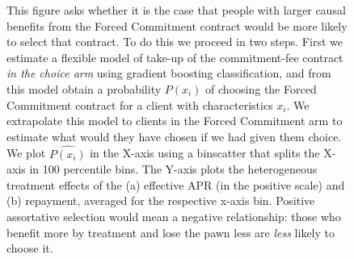 \documentclass[oneside,11pt]{article}
\begin{document}
\begin{figure}[H]
\begin{center}
    \end{center}
     \scriptsize   This figure asks whether it is the case that people with larger causal benefits from the Forced Commitment contract would be more likely to select that contract. To do this we proceed in two steps. First we estimate a flexible model of take-up of the commitment-fee contract \textit{in the choice arm} using gradient boosting classification, and from this model obtain a probability $P(x_i)$ of choosing the Forced Commitment contract for a client with characteristics $x_i$. We extrapolate this model to clients in the Forced Commitment arm to estimate what would they have chosen if we had given them choice. We plot $\widehat{P(x_i)}$ in the X-axis using a binscatter that splits the X-axis in 100 percentile bins. The Y-axis plots the heterogeneous treatment effects of the (a) effective APR (in the positive scale) and (b) repayment, averaged for the respective x-axis bin. Positive assortative selection would mean a negative relationship: those who benefit more by treatment and lose the pawn less are \emph{less} likely to choose it. 
\end{figure}

 
    


\cleardoublepage
\end{document}
